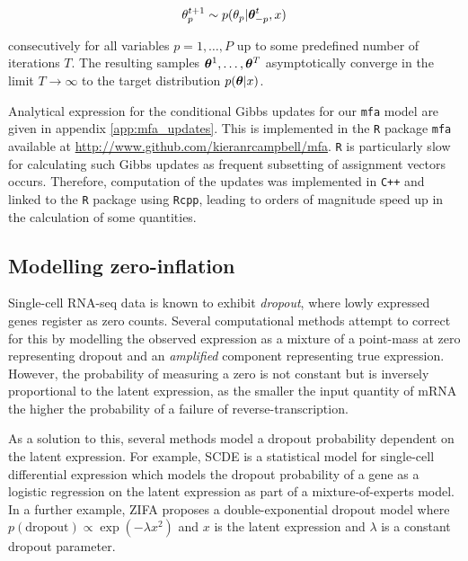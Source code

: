 \begin{equation}
		\theta_p^{t+1}  \sim p(\theta_p | {\bm \theta}^t_{-p}, x)
\end{equation}

consecutively for all variables $p = 1, \ldots, P$ up to some predefined number of iterations $T$. The resulting samples ${\bm \theta}^1, \ldots, \bm \theta^T$ asymptotically converge in the limit $T \rightarrow \infty$ to the target distribution $p({\bm \theta} | x)$.

Analytical expression for the conditional Gibbs updates for our \texttt{mfa} model are given in appendix \ref{app:mfa_updates}. This is implemented in the \texttt{R} package \texttt{mfa} available at \url{http://www.github.com/kieranrcampbell/mfa}. \texttt{R} is particularly slow for calculating such Gibbs updates as frequent subsetting of assignment vectors occurs. Therefore, computation of the updates was implemented in \texttt{C++} and linked to the \texttt{R} package using \texttt{Rcpp}, leading to orders of magnitude speed up in the calculation of some quantities.

\subsection{Modelling zero-inflation}

Single-cell RNA-seq data is known to exhibit \emph{dropout}, where lowly expressed genes register as zero counts. Several computational methods attempt to correct for this by modelling the observed expression as a mixture of a point-mass at zero representing dropout and an \emph{amplified} component representing true expression. However, the probability of measuring a zero is not constant but is inversely proportional to the latent expression, as the smaller the input quantity of mRNA the higher the probability of a failure of reverse-transcription.

As a solution to this, several methods model a dropout probability dependent on the latent expression. For example, SCDE \cite{kharchenko2014bayesian} is a statistical model for single-cell differential expression which models the dropout probability of a gene as a logistic regression on the latent expression as part of a mixture-of-experts model.
In a further example, ZIFA \cite{pierson2015zifa} proposes a double-exponential dropout model where $p(\text{dropout}) \propto \exp(-\lambda x^2)$ and $x$ is the latent expression and $\lambda$ is a constant dropout parameter.

